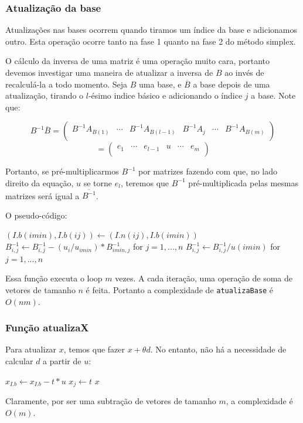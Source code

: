 \documentclass[12pt]{article}
\begin{document}
\subsubsection{Atualização da base}
Atualizações nas bases ocorrem quando tiramos um índice da base e adicionamos outro. Esta operação ocorre tanto na fase 1 quanto na fase 2 do método simplex.

O cálculo da inversa de uma matriz é uma operação muito cara, portanto devemos investigar uma maneira de atualizar a inversa de $B$ ao invés de recalculá-la a todo momento. Seja $B$ uma base, e $\overline{B}$ a base depois de uma atualização, tirando o $l$-ésimo indice básico e adicionando o índice $j$ a base. Note que:
\begin{center}
$$
B^{-1}\overline{B} =
\begin{pmatrix}
B^{-1}A_{B(1)}  & \cdots & B^{-1}A_{B(l - 1)} & B^{-1}A_j & \cdots & B^{-1}A_{B(m)} \\    
\end{pmatrix}
$$
$$
=\begin{pmatrix}
e_1  & \cdots & e_{l-1} & u & \cdots & e_m \\    
\end{pmatrix}
$$
\end{center}
Portanto, se pré-multiplicarmos $B^{-1}$ por matrizes fazendo com que, no lado direito da equação, $u$ se torne $e_l$, teremos que $B^{-1}$ pré-multiplicada pelas mesmas matrizes será igual a $\overline{B^{-1}}$.

O pseudo-código:
\begin{algorithmic}
\State $(I.b(imin), I.b(ij)) \gets (I.n(ij), I.b(imin))$
		\State $B^{-1}_{i, j} \gets B^{-1}_{i, j} - (u_i / u_{imin}) * B^{-1}_{imin, j}$ for $j = 1, ..., n$
	\EndIf
\EndFor
\State $B^{-1}_{i, j} \gets B^{-1}_{i, j} / u(imin)$ for $j = 1, ..., n$
\EndFunction
\end{algorithmic}

Essa função executa o loop $m$ vezes. A cada iteração, uma operação de soma de vetores de tamanho $n$ é feita. Portanto a complexidade de \texttt{atualizaBase} é $O(nm)$.

\subsubsection{Função atualizaX}
Para atualizar $x$, temos que fazer $x + \theta d$. No entanto, não há a necessidade de calcular $d$ a partir de $u$:
\begin{algorithmic}
	\State $x_{I.b} \gets x_{I.b} - t * u$
	\State $x_j \gets t$
	\Return $x$
\EndFunction
\end{algorithmic}
Claramente, por ser uma subtração de vetores de tamanho $m$, a complexidade é $O(m)$.
\end{document}
